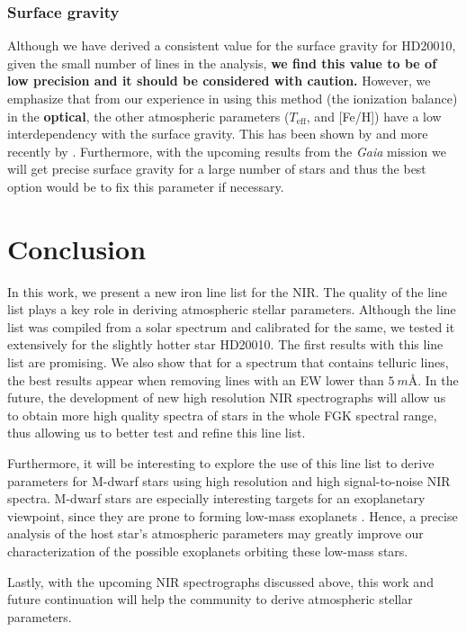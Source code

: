 \documentclass{aa}
\begin{document}
\subsubsection{Surface gravity}
\label{subs:surface_gravity}
Although we have derived a consistent value for the surface gravity for
HD20010, given the small number of  lines in the analysis,
\textbf{we find this value to be of low precision and it should be considered with caution.}
However, we emphasize that from our experience in using this method (the ionization
balance) in the \textbf{optical}, the other atmospheric parameters ($T_\mathrm{eff}$,
and [Fe/H]) have a low interdependency with the surface gravity. This has
been shown by \citet{Torres2012} and more recently by \citet{Mortier2014}.
Furthermore, with the upcoming results from the \emph{Gaia} mission we will
get precise surface gravity for a large number of stars and thus the best
option would be to fix this parameter if necessary.


\section{Conclusion}
\label{sec:conclusion}

In this work, we present a new iron line list for the NIR. The quality
of the line list plays a key role in deriving atmospheric stellar
parameters. Although the line list was compiled from a solar spectrum and
calibrated for the same, we tested it extensively for the slightly
hotter star HD20010. The first results with this line list are
promising. We also show that for a spectrum that contains telluric
lines, the best results appear when removing lines with an EW lower
than $\SI{5}{m\angstrom}$. In the future, the development of new high
resolution NIR spectrographs will allow us to obtain more high quality
spectra of stars in the whole FGK spectral range, thus allowing us to
better test and refine this line list.

Furthermore, it will be interesting to explore the use of this line list
to derive parameters for M-dwarf stars using high resolution and high
signal-to-noise NIR spectra. M-dwarf stars are especially interesting
targets for an exoplanetary viewpoint, since they are prone to forming
low-mass exoplanets \citep{Bonfils2013}. Hence, a precise analysis
of the host star's atmospheric parameters may greatly improve our
characterization of the possible exoplanets orbiting these low-mass
stars.

Lastly, with the upcoming NIR spectrographs  discussed above,
this work and future continuation will help the community to derive
atmospheric stellar parameters.
\end{document}
